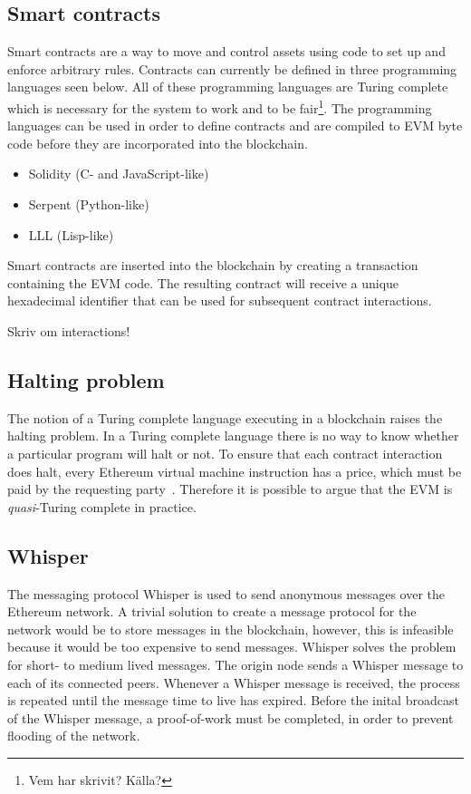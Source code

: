 \subsection{Smart contracts}
Smart contracts are a way to move and control assets using code to set up and enforce arbitrary rules. Contracts can currently be defined in three programming languages seen below. All of these programming languages are Turing complete which is necessary for the system to work and to be fair\footnote{Vem har skrivit? Källa?}. The programming languages can be used in order to define contracts and are compiled to EVM byte code before they are incorporated into the blockchain.

\begin{itemize}
    \item Solidity (C- and JavaScript-like)
    \item Serpent (Python-like)
    \item LLL (Lisp-like)
\end{itemize}

Smart contracts are inserted into the blockchain by creating a transaction containing the EVM code. The resulting contract will receive a unique hexadecimal identifier that can be used for subsequent contract interactions.

Skriv om interactions!


\subsection{Halting problem}
The notion of a Turing complete language executing in a blockchain raises the halting problem. In a Turing complete language there is no way to know whether a particular program will halt or not. To ensure that each contract interaction does halt, every Ethereum virtual machine instruction has a price, which must be paid by the requesting party~\cite{ethereum:yellow}. Therefore it is possible to argue that the EVM is \emph{quasi}-Turing complete in practice.

\subsection{Whisper}
The messaging protocol Whisper is used to send anonymous messages over the Ethereum network. A trivial solution to create a message protocol for the network would be to store messages in the blockchain, however, this is infeasible because it would be too expensive to send messages. Whisper solves the problem for short- to medium lived messages. The origin node sends a Whisper message to each of its connected peers. Whenever a Whisper message is received, the process is repeated until the message time to live has expired. Before the inital broadcast of the Whisper message, a proof-of-work must be completed, in order to prevent flooding of the network.

